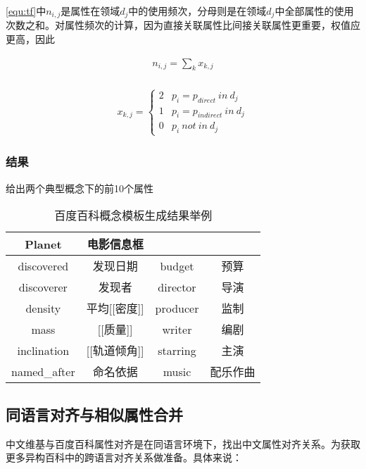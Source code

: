 \ref{equ:tf}中$n_{i,j}$是属性在领域$d_{j}$中的使用频次，分母则是在领域$d_{j}$中全部属性的使用次数之和。对属性频次的计算，因为直接关联属性比间接关联属性更重要，权值应更高，因此

\begin{align}
n_{i,j} = {\sum_{k}{x_{k,j}}}\\
\end{align}

\begin{align}
x_{k,j} =
\left\{\begin{matrix}
2 & p_i = p_{direct} \ in \ d_j\\
1 & p_i = p_{indirect} \ in \ d_j\\
0 & p_i \ not \ in \ d_j
\end{matrix}\right.
\end{align}

\subsubsection{结果}
给出两个典型概念下的前10个属性

\begin{table}[htb]
  \centering
  \caption{百度百科概念模板生成结果举例}
  \label{tab:baidu-template-examples}
    \begin{tabular}{cccc}
      \toprule[1.5pt]
         {Planet} & {电影信息框}\\ \midrule[1pt]
         discovered & 发现日期      & budget & 预算 \\
         discoverer & 发现者        & director & 导演\\
         density & 平均[[密度]]     & producer& 监制 \\
         mass & [[质量]]            & writer & 编剧\\
         inclination & [[轨道倾角]] & starring & 主演\\
         named\_after& 命名依据     & music &  配乐作曲\\
      \bottomrule[1.5pt]
    \end{tabular}
\end{table}


\subsection{同语言对齐与相似属性合并}
\label{sec:similar-property}

{\heiti 中文维基与百度百科属性对齐}是在同语言环境下，找出中文属性对齐关系。为获取更多异构百科中的跨语言对齐关系做准备。具体来说：

